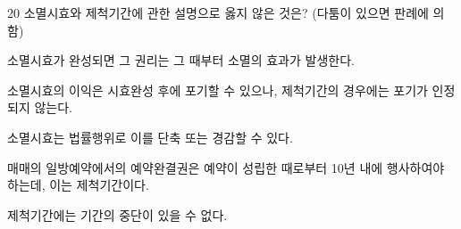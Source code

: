 \begin{question}{20}
소멸시효와 제척기간에 관한 설명으로 옳지 않은 것은? (다툼이 있으면 판례에 의함)
\begin{choices}
  \item 소멸시효가 완성되면 그 권리는 그 때부터 소멸의 효과가 발생한다.
  \item 소멸시효의 이익은 시효완성 후에 포기할 수 있으나, 제척기간의 경우에는 포기가 인정되지 않는다.
  \item 소멸시효는 법률행위로 이를 단축 또는 경감할 수 있다.
  \item 매매의 일방예약에서의 예약완결권은 예약이 성립한 때로부터 10년 내에 행사하여야 하는데, 이는 제척기간이다.
  \item 제척기간에는 기간의 중단이 있을 수 없다.
\end{choices}
\end{question}
